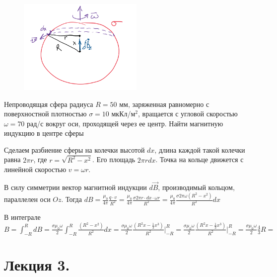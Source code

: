 \documentclass[12pt]{article}
\begin{document}
\begin{minipage}{\textwidth}
    \begin{figure}
        \includegraphics[width=6cm]{physics2/images/physics2_2025_02_17_4}
    \end{figure}

    \Ex Непроводящая сфера радиуса $R = 50$ мм, заряженная равномерно с поверхностной плотностью $\sigma = 10$ мкКл/м$^2$, 
    вращается с угловой скоростью $\omega = 70$ рад/с вокруг оси, проходящей через ее центр. Найти магнитную индукцию в центре сферы

    \mediumvspace

    Сделаем разбиение сферы на колечки высотой $dx$, длина каждой такой колечки равна $2\pi r$, где $r = \sqrt{R^2 - x^2}$.
    Его площадь $2\pi r dx$. Точка на кольце движется с линейной скоростью $v = \omega r$.
\end{minipage}

В силу симметрии вектор магнитной индукции $d\vec{B}$, производимый кольцом, параллелен оси $Oz$. 
Тогда $dB = \frac{\mu_0}{4\pi} \frac{q \cdot v}{R^2} = \frac{\mu_0}{4\pi} \frac{\sigma 2\pi r \cdot dx \cdot \omega r}{R^2} = 
\frac{\mu_0}{4\pi} \frac{\sigma 2\pi \omega (R^2 - x^2)}{R^2} dx$

В интеграле $B = \int_{-R}^R dB = \frac{\sigma \mu_0 \omega}{2} \int_{-R}^R \frac{(R^2 - x^2)}{R^2} dx = 
\frac{\sigma \mu_0 \omega}{2} \frac{(R^2 x - \frac{1}{3} x^3)}{R^2} \Big|_{-R}^R = 
\frac{\sigma \mu_0 \omega}{2} \frac{(R^2 x - \frac{1}{3} x^3)}{R^2} \Big|_{-R}^R = 
\frac{\sigma \mu_0 \omega}{2} \frac{4}{3} R = $ 

\clearpage








\section{Лекция 3. }
\end{document}
